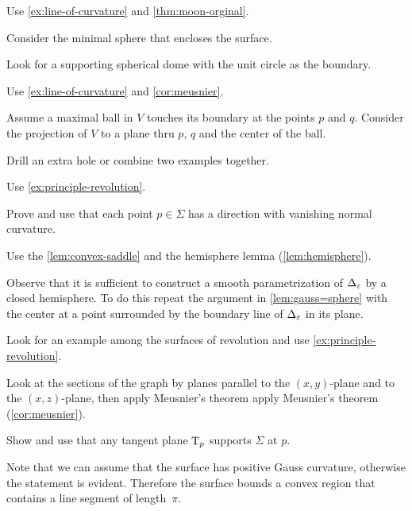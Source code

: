  Use \ref{ex:line-of-curvature} and \ref{thm:moon-orginal}.

Consider the minimal sphere that encloses the surface.

Look for a supporting spherical dome with the unit circle as the boundary.

 Use \ref{ex:line-of-curvature} and \ref{cor:meusnier}.

Assume a maximal ball in $V$ touches its boundary at the points $p$ and $q$.
Consider the projection of $V$ to a plane thru $p$, $q$ and the center of the ball. 

 Drill an extra hole or combine two examples together.

 Use \ref{ex:principle-revolution}.

 Prove and use that each point $p\in\Sigma$ has a direction with vanishing normal curvature.

 Use the \ref{lem:convex-saddle} and the hemisphere lemma (\ref{lem:hemisphere}).

 Observe that it is sufficient to construct a smooth parametrization of $\Delta_\varepsilon$ by a closed hemisphere.
To do this repeat the argument in \ref{lem:gauss=sphere} with the center at a point surrounded by the boundary line of $\Delta_\varepsilon$ in its plane.

 Look for an example among the surfaces of revolution and use \ref{ex:principle-revolution}.

 Look at the sections of the graph by planes parallel to the $(x,y)$-plane and to the $(x,z)$-plane, then apply Meusnier’s theorem apply Meusnier's theorem (\ref{cor:meusnier}).

 Show and use that any tangent plane $\mathrm{T}_p$ supports $\Sigma$ at $p$.

Note that we can assume that the surface has positive Gauss curvature, otherwise the statement is evident.
Therefore the surface bounds a convex region that contains a line segment of length~$\pi$.

